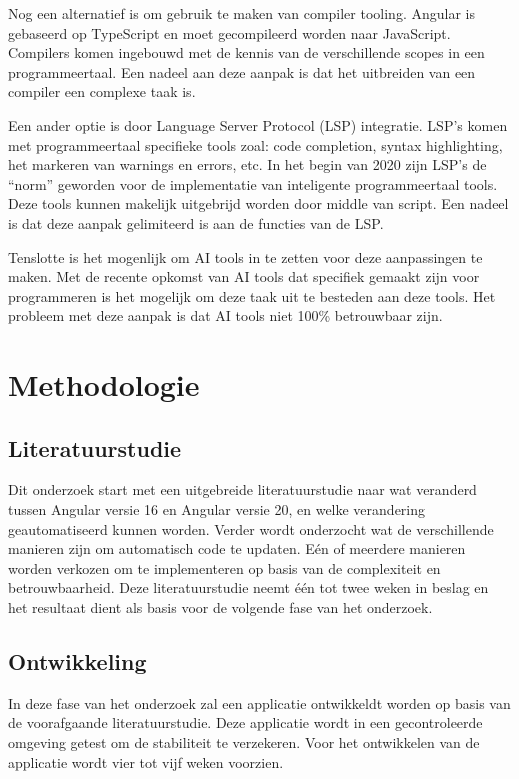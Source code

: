 Nog een alternatief is om gebruik te maken van compiler tooling.
Angular is gebaseerd op TypeScript en moet gecompileerd worden naar JavaScript.
Compilers komen ingebouwd met de kennis van de verschillende scopes in een programmeertaal.
Een nadeel aan deze aanpak is dat het uitbreiden van een compiler een complexe taak is.

Een ander optie is door Language Server Protocol (LSP) integratie.
LSP's komen met programmeertaal specifieke tools zoal: code completion, syntax highlighting, het markeren van warnings en errors, etc.
In het begin van 2020 zijn LSP's de ``norm'' geworden voor de implementatie van inteligente programmeertaal tools.
Deze tools kunnen makelijk uitgebrijd worden door middle van script.
Een nadeel is dat deze aanpak gelimiteerd is aan de functies van de LSP.

Tenslotte is het mogenlijk om AI tools in te zetten voor deze aanpassingen te maken.
Met de recente opkomst van AI tools dat specifiek gemaakt zijn voor programmeren is het mogelijk om deze taak uit te besteden aan deze tools.
Het probleem met deze aanpak is dat AI tools niet 100\% betrouwbaar zijn.

\section{Methodologie}
\label{sec:methodologie}

\subsection{Literatuurstudie}

Dit onderzoek start met een uitgebreide literatuurstudie naar wat veranderd tussen Angular versie 16 en Angular versie 20, en welke verandering geautomatiseerd kunnen worden.
Verder wordt onderzocht wat de verschillende manieren zijn om automatisch code te updaten.
Eén of meerdere manieren worden verkozen om te implementeren op basis van de complexiteit en betrouwbaarheid.
Deze literatuurstudie neemt één tot twee weken in beslag en het resultaat dient als basis voor de volgende fase van het onderzoek.

\subsection{Ontwikkeling}

In deze fase van het onderzoek zal een applicatie ontwikkeldt worden op basis van de voorafgaande literatuurstudie.
Deze applicatie wordt in een gecontroleerde omgeving getest om de stabiliteit te verzekeren.
Voor het ontwikkelen van de applicatie wordt vier tot vijf weken voorzien.

